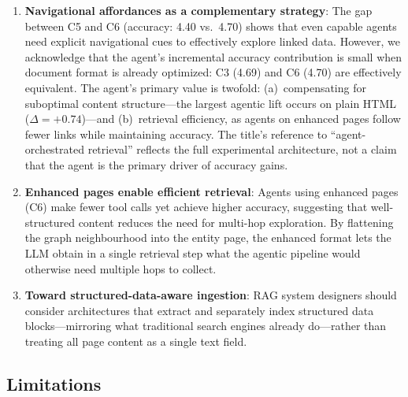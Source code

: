 \documentclass[runningheads]{llncs}
\begin{document}
\begin{enumerate}
          Crucially, all materialized data originates from the same
          openly accessible Linked Data Platform---the same
          dereferenceable URIs visible in the baseline HTML.  The
          structured data is referenced, auditable, and
          independently verifiable, making it easy to trust and
          validate.  The +29.6\% accuracy gain therefore reflects
          the quality and accessibility of the underlying data, not
          the technology stack used to present it.
    \item \textbf{Navigational affordances as a complementary strategy}:
          The gap between C5 and C6 (accuracy: 4.40 vs.\ 4.70)
          shows that even capable agents need explicit navigational
          cues to effectively explore linked data.  However, we
          acknowledge that the agent's incremental accuracy contribution
          is small when document format is already optimized:
          C3 (4.69) and C6 (4.70) are effectively equivalent.
          The agent's primary value is twofold: (a)~compensating for
          suboptimal content structure---the largest agentic lift
          occurs on plain HTML ($\Delta = +0.74$)---and (b)~retrieval
          efficiency, as agents on enhanced pages follow fewer links
          while maintaining accuracy.  The title's reference to
          ``agent-orchestrated retrieval'' reflects the full
          experimental architecture, not a claim that the agent is
          the primary driver of accuracy gains.
    \item \textbf{Enhanced pages enable efficient retrieval}:
          Agents using enhanced pages (C6) make fewer tool calls
          yet achieve higher accuracy, suggesting
          that well-structured content reduces the need for
          multi-hop exploration.  By flattening the graph
          neighbourhood into the entity page, the enhanced format
          lets the LLM obtain in a single retrieval step what the
          agentic pipeline would otherwise need multiple hops to
          collect.
    \item \textbf{Toward structured-data-aware ingestion}: RAG system
          designers should consider architectures that extract and
          separately index structured data blocks---mirroring what
          traditional search engines already do---rather than treating
          all page content as a single text field.
\end{enumerate}

\subsection{Limitations}
\label{sec:limitations}
\end{document}
